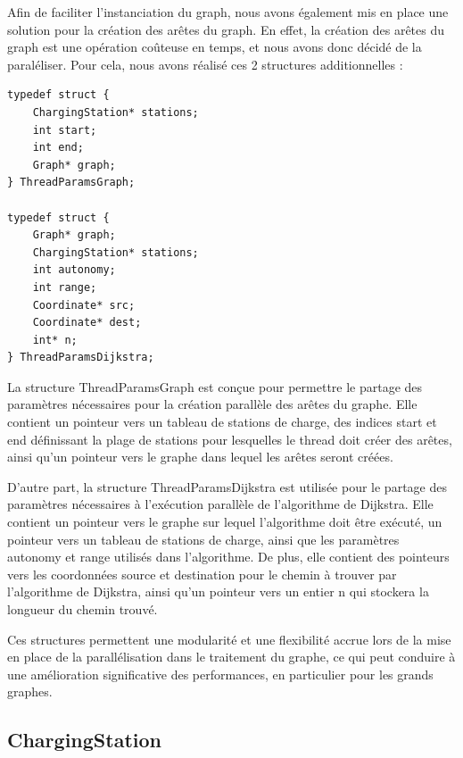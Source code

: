 \documentclass[french,a4paper]{article}
\begin{document}
    Afin de faciliter l'instanciation du graph, nous avons également mis en place une solution pour la création des arêtes du graph. En effet, la création des arêtes du graph est une opération coûteuse en temps, et nous avons donc décidé de la paraléliser. Pour cela, nous avons réalisé ces 2 structures additionnelles :

    \begin{center}
        \begin{lstlisting}[caption=Structure Annexes à Graph]
typedef struct {
    ChargingStation* stations;
    int start;
    int end;
    Graph* graph;
} ThreadParamsGraph;

typedef struct {
    Graph* graph;
    ChargingStation* stations;
    int autonomy;
    int range;
    Coordinate* src;
    Coordinate* dest;
    int* n;
} ThreadParamsDijkstra;
        \end{lstlisting}
    \end{center}

    La structure ThreadParamsGraph est conçue pour permettre le partage des paramètres nécessaires pour la création parallèle des arêtes du graphe. Elle contient un pointeur vers un tableau de stations de charge, des indices start et end définissant la plage de stations pour lesquelles le thread doit créer des arêtes, ainsi qu'un pointeur vers le graphe dans lequel les arêtes seront créées.

    D'autre part, la structure ThreadParamsDijkstra est utilisée pour le partage des paramètres nécessaires à l'exécution parallèle de l'algorithme de Dijkstra. Elle contient un pointeur vers le graphe sur lequel l'algorithme doit être exécuté, un pointeur vers un tableau de stations de charge, ainsi que les paramètres autonomy et range utilisés dans l'algorithme. De plus, elle contient des pointeurs vers les coordonnées source et destination pour le chemin à trouver par l'algorithme de Dijkstra, ainsi qu'un pointeur vers un entier n qui stockera la longueur du chemin trouvé.

    Ces structures permettent une modularité et une flexibilité accrue lors de la mise en place de la parallélisation dans le traitement du graphe, ce qui peut conduire à une amélioration significative des performances, en particulier pour les grands graphes.



    \subsection{ChargingStation}
\end{document}
